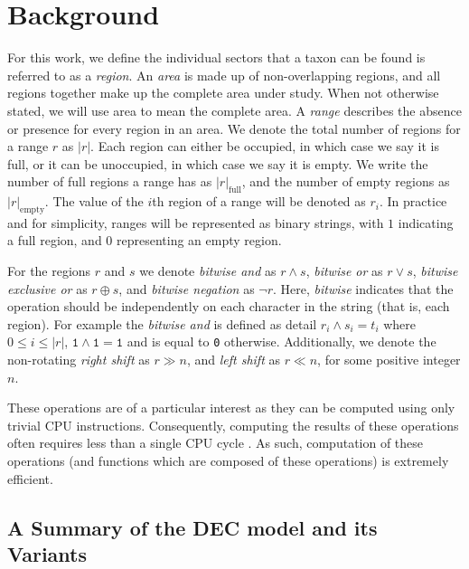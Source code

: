 \documentclass[a4paper]{article}
\newcommand{\CountFull}[1]{|#1|_\text{full}}
\newcommand{\CountEmpty}[1]{|#1|_\text{empty}}
\newcommand{\rand}[2]{#1 \land #2}
\newcommand{\ror}[2]{#1 \lor #2}
\newcommand{\rneg}[1]{\neg #1}
\newcommand{\rxor}[2]{#1 \oplus #2}
\newcommand{\rLshift}[2]{#1 \ll #2}
\newcommand{\rRshift}[2]{#1 \gg #2}
\begin{document}
\section{Background}

For this work, we define the individual sectors that a taxon can be found is referred to as a \textit{region}.
An \textit{area} is made up of non-overlapping regions, and all regions together make up the complete area under study.
When not otherwise stated, we will use area to mean the complete area.
A \textit{range} describes the absence or presence for every region in an area.
We denote the total number of regions for a range \( r \) as \( |r| \).
Each region can either be occupied, in which case we say it is full, or it can be unoccupied, in which case we say it is
empty.
We write the number of full regions a range has as \( \CountFull{r} \), and the number of empty regions as \(
\CountEmpty{r} \).
The value of the $i$th region of a range will be denoted as $r_i$.
In practice and for simplicity, ranges will be represented as binary strings, with $1$ indicating a full region, and $0$
representing an empty region.

For the regions $r$ and $s$ we denote \textit{bitwise and} as $\rand{r}{s}$, \textit{bitwise or} as $\ror{r}{s}$,
\textit{bitwise exclusive or} as $\rxor{r}{s}$, and \textit{bitwise negation} as $\rneg{r}$.
Here, \textit{bitwise} indicates that the operation should be independently on each character in the string (that is,
each region). 
For example the \textit{bitwise and} is defined as detail $r_i \land s_i = t_i$ where $0 \leq i \leq |r|$, $\texttt{1}
\land \texttt{1} = \texttt{1}$ and is equal to \texttt{0} otherwise.
Additionally, we denote the non-rotating \textit{right shift} as $\rRshift{r}{n}$, and \textit{left shift} as
$\rLshift{r}{n}$, for some positive integer $n$.

These operations are of a particular interest as they can be computed using only trivial CPU instructions.
Consequently, computing the results of these operations often requires less than a single CPU cycle\footnotemark
\citep{Abel19a}.
As such, computation of these operations (and functions which are composed of these operations) is extremely efficient.


\subsection{A Summary of the DEC model and its Variants} \label{sec:model}
\end{document}
